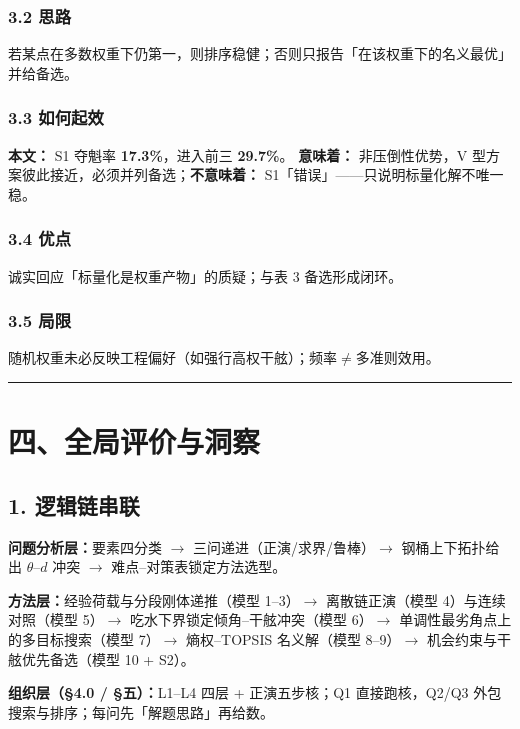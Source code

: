 \documentclass[UTF8,a4paper,zihao=-4]{ctexart}
\begin{document}
\subsubsection{\texorpdfstring{3.2 思路}{3.2 思路}}
若某点在多数权重下仍第一，则排序稳健；否则只报告「在该权重下的名义最优」并给备选。

\subsubsection{\texorpdfstring{3.3 如何起效}{3.3 如何起效}}
\textbf{本文：} S1 夺魁率 \textbf{17.3\%}，进入前三 \textbf{29.7\%}。  
\textbf{意味着：} 非压倒性优势，V 型方案彼此接近，必须并列备选；\textbf{不意味着：} S1「错误」------只说明标量化解不唯一稳。

\subsubsection{\texorpdfstring{3.4 优点}{3.4 优点}}
诚实回应「标量化是权重产物」的质疑；与表 3 备选形成闭环。

\subsubsection{\texorpdfstring{3.5 局限}{3.5 局限}}
随机权重未必反映工程偏好（如强行高权干舷）；频率$\ne$多准则效用。

\vspace{0.4em}\hrule\vspace{0.4em}

\section{\texorpdfstring{四、全局评价与洞察}{四、全局评价与洞察}}

\subsection{\texorpdfstring{1. 逻辑链串联}{1. 逻辑链串联}}

\textbf{问题分析层：}要素四分类 $\to$ 三问递进（正演/求界/鲁棒）$\to$ 钢桶上下拓扑给出 $\theta$--$d$ 冲突 $\to$ 难点--对策表锁定方法选型。

\textbf{方法层：}经验荷载与分段刚体递推（模型 1--3）$\to$ 离散链正演（模型 4）与连续对照（模型 5）$\to$ 吃水下界锁定倾角--干舷冲突（模型 6）$\to$ 单调性最劣角点上的多目标搜索（模型 7）$\to$ 熵权--TOPSIS 名义解（模型 8--9）$\to$ 机会约束与干舷优先备选（模型 10 + S2）。

\textbf{组织层（§4.0 / §五）：}L1--L4 四层 + 正演五步核；Q1 直接跑核，Q2/Q3 外包搜索与排序；每问先「解题思路」再给数。
\end{document}
